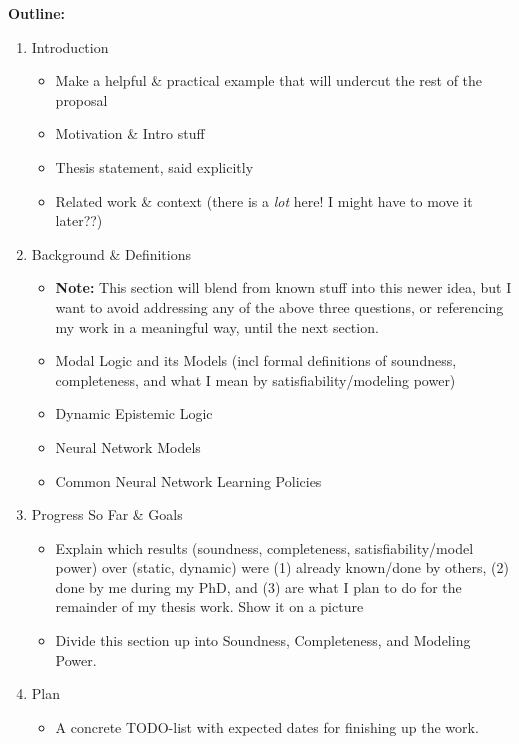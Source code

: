 \documentclass[letterpaper]{article}
\begin{document}
\textbf{Outline:}
\begin{enumerate}
    \item Introduction
    \begin{itemize}
        \item Make a helpful \& practical example that will undercut the rest of the proposal
        \item Motivation \& Intro stuff
        \item Thesis statement, said explicitly
        \item Related work \& context (there is a \emph{lot} here!  I might have to move it later??)
    \end{itemize}
    \item Background \& Definitions
    \begin{itemize}
        \item \textbf{Note:} This section will blend from known stuff into this newer idea, but I want to avoid addressing any of the above three questions, or referencing my work in a meaningful way, until the next section.
        \item Modal Logic and its Models (incl formal definitions of soundness, completeness, and what I mean by satisfiability/modeling power)
        \item Dynamic Epistemic Logic
        \item Neural Network Models
        \item Common Neural Network Learning Policies
    \end{itemize}
    \item Progress So Far \& Goals
    \begin{itemize}
        \item Explain which results (soundness, completeness, satisfiability/model power) over (static, dynamic) were (1) already known/done by others, (2) done by me during my PhD, and (3) are what I plan to do for the remainder of my thesis work.  Show it on a picture
        \item Divide this section up into Soundness, Completeness, and Modeling Power.
    \end{itemize}
    \item Plan
    \begin{itemize}
        \item A concrete TODO-list with expected dates for finishing up the work.
    \end{itemize}
\end{enumerate}


\end{document}
